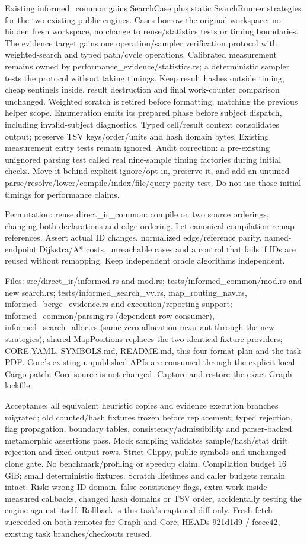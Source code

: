 \documentclass[11pt]{article}
\begin{document}
Existing informed\_common gains SearchCase plus static SearchRunner strategies
for the two existing public engines. Cases borrow the original workspace: no
hidden fresh workspace, no change to reuse/statistics tests or timing boundaries.
The evidence target gains one operation/sampler verification protocol with
weighted-search and typed path/cycle operations. Calibrated measurement remains
owned by performance\_evidence/statistics.rs; a deterministic sampler tests the
protocol without taking timings. Keep result hashes outside timing, cheap
sentinels inside, result destruction and final work-counter comparison unchanged. Weighted scratch is retired before formatting, matching the previous helper scope. Enumeration emits its prepared phase before subject dispatch, including invalid-subject diagnostics.
Typed cell/result context consolidates output; preserve TSV keys/order/units and
hash domain bytes. Existing measurement entry tests remain ignored. Audit correction: a pre-existing unignored parsing test called real nine-sample timing factories during initial checks. Move it behind explicit ignore/opt-in, preserve it, and add an untimed parse/resolve/lower/compile/index/file/query parity test. Do not use those initial timings for performance claims.

Permutation: reuse direct\_ir\_common::compile on two source orderings, changing
both declarations and edge ordering. Let canonical compilation remap references.
Assert actual ID changes, normalized edge/reference parity, named-endpoint
Dijkstra/A* costs, unreachable cases and a control that fails if IDs are reused
without remapping. Keep independent oracle algorithms independent.

Files: src/direct\_ir/informed.rs and mod.rs; tests/informed\_common/mod.rs and
new search.rs; tests/informed\_search\_vv.rs, map\_routing\_nav.rs,
informed\_berge\_evidence.rs and execution/reporting support; informed\_common/parsing.rs (dependent row consumer), informed\_search\_alloc.rs (same zero-allocation invariant through the new strategies); shared MapPositions replaces the two identical fixture providers;
CORE.YAML, SYMBOLS.md, README.md, this four-format plan and the task PDF.
Core's existing unpublished APIs are consumed through the explicit local Cargo
patch. Core source is not changed. Capture and restore the exact Graph lockfile.

Acceptance: all equivalent heuristic copies and evidence execution branches
migrated; old counted/hash fixtures frozen before replacement; typed rejection,
flag propagation, boundary tables, consistency/admissibility and parser-backed
metamorphic assertions pass. Mock sampling validates sample/hash/stat drift
rejection and fixed output rows. Strict Clippy, public symbols and unchanged
clone gate. No benchmark/profiling or speedup claim. Compilation budget 16 GiB;
small deterministic fixtures. Scratch lifetimes and caller budgets remain intact.
Risk: wrong ID domain, false consistency flags, extra work inside measured callbacks,
changed hash domains or TSV order, accidentally testing the engine against itself.
Rollback is this task's captured diff only. Fresh fetch succeeded on both remotes
for Graph and Core; HEADs 921d1d9 / fceee42, existing task branches/checkouts reused.
\end{document}
